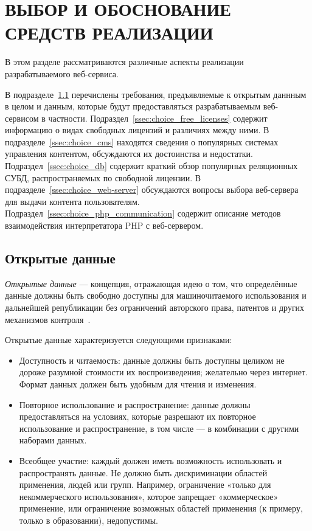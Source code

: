 \section[Выбор и обоснование средств реализации]{ВЫБОР И ОБОСНОВАНИЕ \\ СРЕДСТВ РЕАЛИЗАЦИИ}
\label{sec:choice}

В этом разделе рассматриваются различные аспекты реализации разрабатываемого веб-сервиса.

В подразделе~\ref{ssec:choice_opendata} перечислены требования, предъявляемые к открытым даннным
в целом и данным, которые будут предоставляться разрабатываемым веб-сервисом в частности.
Подраздел~\ref{ssec:choice_free_licenses} содержит информацию о видах свободных лицензий и различиях между ними.
В подразделе~\ref{ssec:choice_cms} находятся сведения о популярных системах управления контентом,
обсуждаются их достоинства и недостатки.
Подраздел~\ref{ssec:choice_db} содержит краткий обзор популярных реляционных СУБД,
распространяемых по свободной лицензии.
В подразделе~\ref{ssec:choice_web-server} обсуждаются вопросы выбора веб-сервера для выдачи контента пользователям.
Подраздел~\ref{ssec:choice_php_communication} содержит описание методов взаимодействия интерпретатора PHP с веб-сервером.

\subsection{Открытые данные}
\label{ssec:choice_opendata}

\textit{Открытые данные} --- концепция, отражающая идею о том, что определённые данные
должны быть свободно доступны для машиночитаемого использования и дальнейшей републикации без
ограничений авторского права, патентов и других механизмов контроля~\cite{wiki_opendata}.

Открытые данные характеризуется следующими признаками:
\begin{itemize}

\item
Доступность и читаемость: данные должны быть доступны целиком не дороже
разумной стоимости их воспроизведения; желательно через интернет.
Формат данных должен быть удобным для чтения и изменения.

\item
Повторное использование и распространение: данные должны предоставляться на условиях,
которые разрешают их повторное использование и распространение,
в том числе --- в комбинации с другими наборами данных.

\item
Всеобщее участие: каждый должен иметь возможность использовать и распространять данные.
Не должно быть дискриминации областей применения, людей или групп.
Например, ограничение «только для некоммерческого использования»,
которое запрещает «коммерческое» применение, или ограничение возможных областей применения
(к примеру, только в образовании), недопустимы.

\end{itemize}

